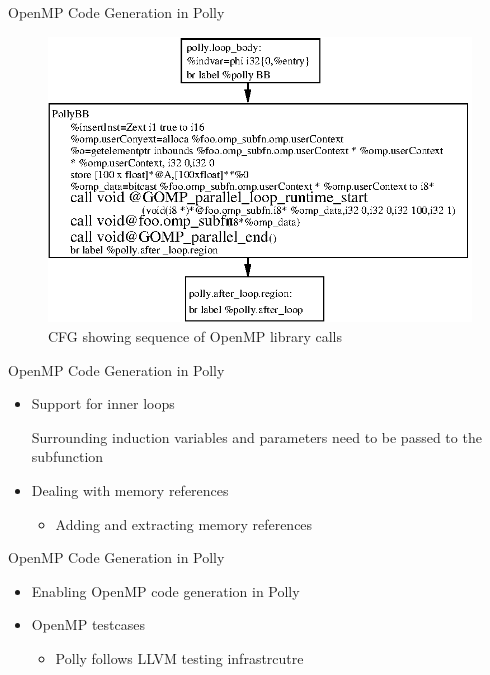 \documentclass{beamer}
\begin{document}
\begin{frame}{OpenMP Code Generation in Polly}
\begin{figure}
  \includegraphics[width=1\textwidth]{images/ompcalls.eps}
  \caption{CFG showing sequence of OpenMP library calls}
  \label{fig:openmp_cfg}
\end{figure}
\end{frame}


\begin{frame}{OpenMP Code Generation in Polly}
\begin{itemize}
\item Support for inner loops

\begin{block}{ }
{\footnotesize}
\end{block}
Surrounding induction variables and parameters need to be passed to the subfunction
\pause
\item Dealing with memory references
\begin{block}{ }
{\footnotesize}
\end{block}
	\begin{itemize}
	\item Adding and extracting memory references
	\end{itemize}
\end{itemize}
\end{frame}


\begin{frame}{OpenMP Code Generation in Polly}
\begin{itemize}
\item Enabling OpenMP code generation in Polly
\begin{block}{ }
{\tiny}
\end{block}
\item OpenMP testcases
	\begin{itemize}
	\item Polly follows LLVM testing infrastrcutre
	\end{itemize}
\end{itemize}
\end{frame}
\end{document}
